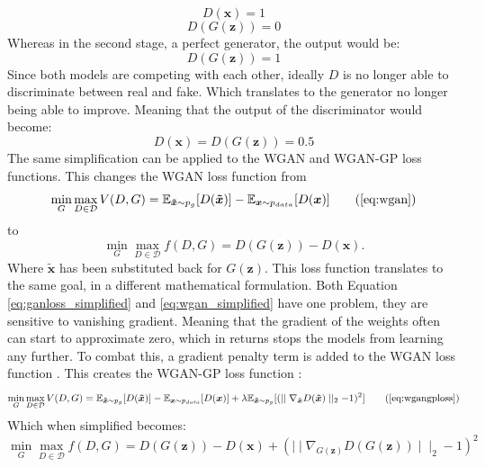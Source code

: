     
\begin{equation}
    D(\boldsymbol{x}) = 1
    \nonumber
\end{equation}
\begin{equation}
    D(G(\boldsymbol{z})) = 0
    \nonumber
\end{equation}
Whereas in the second stage, a perfect generator, the output would be:
\begin{equation}
    D(G(\boldsymbol{z})) = 1
    \nonumber
\end{equation}
Since both models are competing with each other, ideally $D$ is no longer able to discriminate between real and fake. Which translates to the generator no longer being able to improve. Meaning that the output of the discriminator would become:
\begin{equation}
    D(\boldsymbol{x}) = D(G(\boldsymbol{z})) = 0.5
    \nonumber
\end{equation}
The same simplification can be applied to the WGAN and WGAN-GP loss functions. This changes the WGAN loss function from 
\begin{equation}
    \min_{G} \max_{D \in \mathcal{D}} V(D,G) = \mathbb{E}_{\boldsymbol{\tilde{x}} \sim p_g} [D(\boldsymbol{\tilde{x}})] - \mathbb{E}_{\boldsymbol{x} \sim p_{data}} [D(\boldsymbol{x})]
    \tag{\ref{eq:wgan}}
\end{equation}
to 
\begin{equation}
    \min_{G} \max_{D \in \mathcal{D}} f(D,G) = D(G(\boldsymbol{z})) - D(\boldsymbol{x}).
    \label{eq:wgan_simplified}
\end{equation}
Where $\boldsymbol{\tilde{x}}$ has been substituted back for $G(\boldsymbol{z})$. This loss function translates to the same goal, in a different mathematical formulation. Both Equation \ref{eq:ganloss_simplified} and \ref{eq:wgan_simplified} have one problem, they are sensitive to vanishing gradient. Meaning that the gradient of the weights often can start to approximate zero, which in returns stops the models from learning any further. To combat this, a gradient penalty term is added to the WGAN loss function \cite{gulrajani2017improved}. This creates the WGAN-GP loss function \cite{arjovsky2017wasserstein}: 
\begin{equation}
    \min_{G} \max_{D \in \mathcal{D}} V(D,G) = \mathbb{E}_{\boldsymbol{\tilde{x}} \sim p_g} [D(\boldsymbol{\tilde{x}})] - \mathbb{E}_{\boldsymbol{x} \sim p_{data}} [D(\boldsymbol{x})] + \lambda \mathbb{E}_{\boldsymbol{\tilde{x}} \sim p_g} [(\mid \mid \nabla_{\tilde{\boldsymbol{x}}} D(\boldsymbol{\tilde{x}}) \mid \mid _2 - 1 )^2]
    \tag{\ref{eq:wgangploss}}
\end{equation}
Which when simplified becomes:
\begin{equation}
    \min_{G} \max_{D \in \mathcal{D}} f(D,G) = D(G(\boldsymbol{z})) - D(\boldsymbol{x}) + (\mid \mid \nabla_{G(\boldsymbol{z})} D({G(\boldsymbol{z})}) \mid \mid _2 - 1 )^2
\end{equation}









